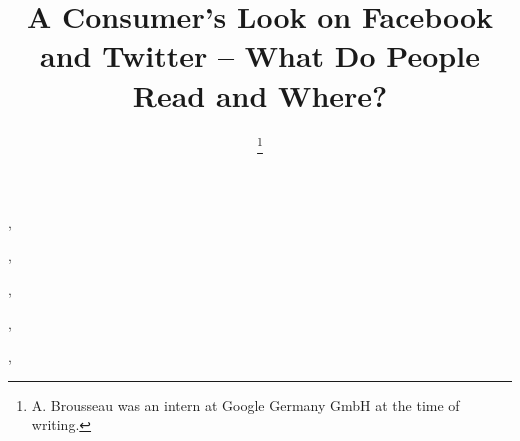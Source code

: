 \documentclass{iosart2c}
\begin{document}
\begin{frontmatter}

\title{A Consumer's Look on Facebook and Twitter -- What Do People Read and Where?}



\author[A]{ },
\author[B]{ },
\author[A]{ \thanks{A. Brousseau was an intern at Google Germany GmbH at the time of writing.}},
\author[C]{ },
\author[B]{ },
\author[D]{ }


\address[A]{Google Germany GmbH, ABC-Str. 19, 20354 Hamburg, Germany,\\
E-mail: tomac@google.com, arnaud.brousseau@gmail.com}
\address[B]{Ghent University -- IBBT, ELIS, Multimedia Lab, Gaston Crommenlaan 8/201, 9050 Ghent, Belgium,\\
E-mail: ruben.verborgh@ugent.be, rik.vandewalle@ugent.be}
\address[C]{EURECOM, Sophia Antipolis, France\\
E-mail: raphael.troncy@eurecom.fr}
\address[D]{Universitat Polit\`{e}cnica de Catalunya, Department LSI, 08034 Barcelona, Spain,\\
E-mail: gabarro@lsi.upc.edu}


\end{frontmatter}
\end{document}
